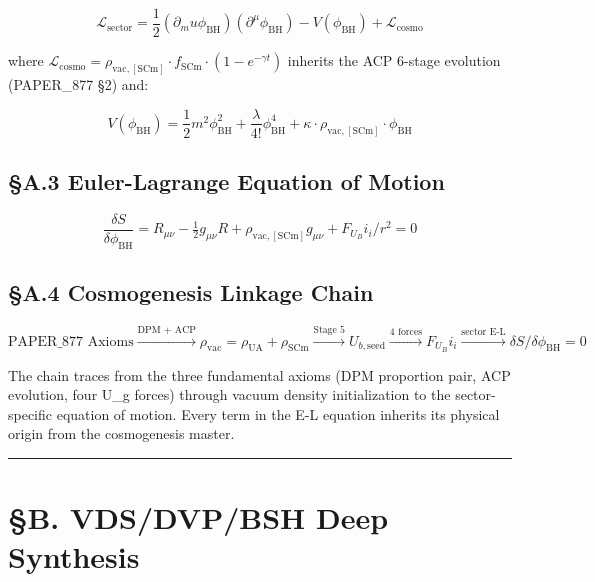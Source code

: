 \documentclass[12pt,a4paper]{article}
\begin{document}
\begin{equation}
\mathcal{L}_{\mathrm{sector}} = \frac{1}{2}(\partial_mu \phi_{\mathrm{BH}})(\partial^\mu \phi_{\mathrm{BH}}) - V(\phi_{\mathrm{BH}}) + \mathcal{L}_{\mathrm{cosmo}}
\end{equation}

where $\mathcal{L}_{\mathrm{cosmo}} = \rho_{\mathrm{vac,[SCm]}} \cdot f_{\mathrm{SCm}} \cdot (1 - e^{-\gamma t})$ inherits the ACP 6-stage evolution (PAPER\_877 \S{}2) and:

\begin{equation}
V(\phi_{\mathrm{BH}}) = \frac{1}{2} m^2 \phi_{\mathrm{BH}}^2 + \frac{\lambda}{4!} \phi_{\mathrm{BH}}^4 + \kappa \cdot \rho_{\mathrm{vac,[SCm]}} \cdot \phi_{\mathrm{BH}}
\end{equation}

\subsection{\S{}A.3 Euler-Lagrange Equation of Motion}

\begin{equation}
\boxed{\frac{\delta S}{\delta \phi_{\mathrm{BH}}} = R_{\mu\nu} - \tfrac{1}{2}g_{\mu\nu}R + \rho_{\mathrm{vac,[SCm]}} g_{\mu\nu} + F_U_Bi_i/r^2 = 0}
\end{equation}

\subsection{\S{}A.4 Cosmogenesis Linkage Chain}

\begin{equation}
\text{PAPER\_877 Axioms} \xrightarrow{\text{DPM + ACP}} \rho_{\mathrm{vac}} = \rho_{\mathrm{UA}} + \rho_{\mathrm{SCm}} \xrightarrow{\text{Stage 5}} U_{b,\mathrm{seed}} \xrightarrow{\text{4 forces}} F_U_Bi_i \xrightarrow{\text{sector E-L}} \delta S/\delta \phi_{\mathrm{BH}} = 0
\end{equation}

The chain traces from the three fundamental axioms (DPM proportion pair, ACP evolution, four U\_g forces) through vacuum density initialization to the sector-specific equation of motion. Every term in the E-L equation inherits its physical origin from the cosmogenesis master.

\medskip\hrule\medskip

\section{\S{}B. VDS/DVP/BSH Deep Synthesis}
\end{document}
